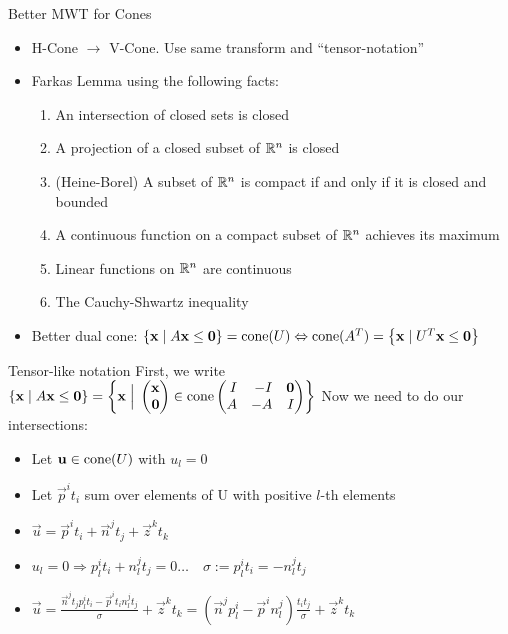 \documentclass{beamer}
\begin{document}
\begin{frame}{Better MWT for Cones}
\begin{itemize}
  \item H-Cone $\to$ V-Cone.  Use same transform and ``tensor-notation''
  \item Farkas Lemma using the following facts:
  \begin{enumerate}
    \item An intersection of closed sets is closed
    \item A projection of a closed subset of $\mathbb{R}^n$ is closed
    \item (Heine-Borel) A subset of $\mathbb{R}^n$ is compact if and only if it is closed
          and bounded
    \item A continuous function on a compact subset of $\mathbb{R}^n$ achieves its maximum
    \item Linear functions on $\mathbb{R}^n$ are continuous
    \item The Cauchy-Shwartz inequality
  \end{enumerate}
  \item Better dual cone: $\left\{\mathbf{x}\;|\; A\mathbf{x}\leq\mathbf{0}\right\} = \operatorname{cone}(U) \Leftrightarrow \operatorname{cone}(A^T) = \left\{\mathbf{x}\;|\; U^T\mathbf{x}\leq\mathbf{0}\right\}$
\end{itemize}
\end{frame}

\begin{frame}{Tensor-like notation}
First, we write $\HC{A} = \set{ \vec{x} \St
    \pmb \vec{x} \\ \0 \pme \in 
      \cone \pmb I & -I & \0 \\ A & -A & I \pme }$
Now we need to do our intersections:
\begin{itemize}
  \item Let $\mathbf{u} \in \operatorname{cone}(U)$ with $u_l = 0$
  \item Let $\vec{p}^i t_i$ sum over elements of U with positive $l$-th elements
  \item $\vec{u} = \vec{p}^i t_i + \vec{n}^j t_j + \vec{z}^k t_k$
  \item $u_l = 0 \Rightarrow p^i_l t_i + n^j_l t_j = 0 \dots \quad \sigma := p^i_l t_i = -n^j_l t_j$
  \item $\vec{u} = \frac{\vec{n}^j t_j p^i_l t_i - \vec{p}^i t_i n^j_l t_j}{\sigma} + \vec{z}^k t_k = (\vec{n}^j p^i_l - \vec{p}^i n^j_l)\frac{t_i t_j}{\sigma} + \vec{z}^k t_k $
\end{itemize}
\end{frame}
\end{document}
